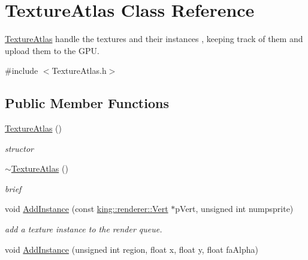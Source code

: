\hypertarget{class_texture_atlas}{\section{Texture\-Atlas Class Reference}
\label{class_texture_atlas}
}


\hyperlink{class_texture_atlas}{Texture\-Atlas} handle the textures and their instances , keeping track of them and upload them to the G\-P\-U.  




{\ttfamily \#include $<$Texture\-Atlas.\-h$>$}

\subsection*{Public Member Functions}
\begin{DoxyCompactItemize}
\item 
\hypertarget{class_texture_atlas_ad38d24295c6a728256392a9f2bcdf8e7}{\hyperlink{class_texture_atlas_ad38d24295c6a728256392a9f2bcdf8e7}{Texture\-Atlas} ()}\label{class_texture_atlas_ad38d24295c6a728256392a9f2bcdf8e7}

\begin{DoxyCompactList}\small\item\em structor \end{DoxyCompactList}\item 
\hypertarget{class_texture_atlas_aed47504c1211eacc876b643e766365d1}{\hyperlink{class_texture_atlas_aed47504c1211eacc876b643e766365d1}{$\sim$\-Texture\-Atlas} ()}\label{class_texture_atlas_aed47504c1211eacc876b643e766365d1}

\begin{DoxyCompactList}\small\item\em brief \end{DoxyCompactList}\item 
\hypertarget{class_texture_atlas_adb753ad8899a9e1045c5cfd84808b3de}{void \hyperlink{class_texture_atlas_adb753ad8899a9e1045c5cfd84808b3de}{Add\-Instance} (const \hyperlink{structking_1_1renderer_1_1_vert}{king\-::renderer\-::\-Vert} $\ast$p\-Vert, unsigned int numpsprite)}\label{class_texture_atlas_adb753ad8899a9e1045c5cfd84808b3de}

\begin{DoxyCompactList}\small\item\em add a texture instance to the render queue. \end{DoxyCompactList}\item 
\hypertarget{class_texture_atlas_a3502f5541a5eee4dd40016570e3d6d22}{void \hyperlink{class_texture_atlas_a3502f5541a5eee4dd40016570e3d6d22}{Add\-Instance} (unsigned int region, float x, float y, float fa\-Alpha)}\label{class_texture_atlas_a3502f5541a5eee4dd40016570e3d6d22}


\end{DoxyCompactItemize}

